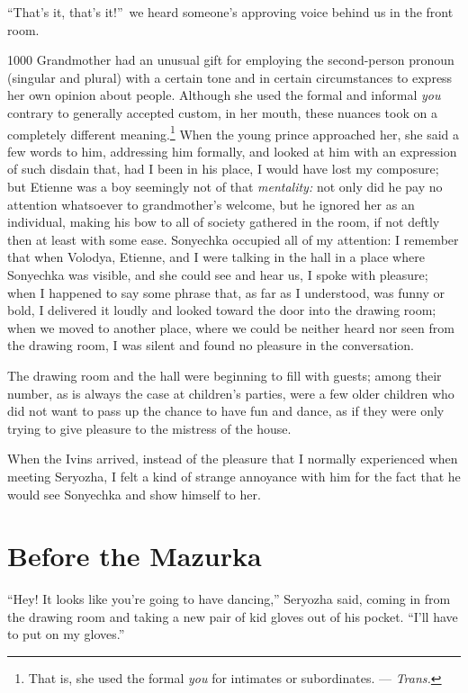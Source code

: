 ``That's it, that's it!''~we heard someone's approving voice behind us in the front room.

\begin{tolerant}{1000}
Grandmother had an unusual gift for employing the second-person pronoun (singular and plural) with a certain tone and in certain circumstances to express her own opinion about people. Although she used the formal and informal \textit{you} contrary to generally accepted custom, in her mouth, these nuances took on a completely different meaning.\footnote{That is, she used the formal \textit{you} for intimates or subordinates. --- \textit{Trans.}} When the young prince approached her, she said a few words to him, addressing him formally, and looked at him with an expression of such disdain that, had I been in his place, I would have lost my composure; but Etienne was a boy seemingly not of that \emph{mentality:} not only did he pay no attention whatsoever to grandmother's welcome, but he ignored her as an individual, making his bow to all of society gathered in the room, if not deftly then at least with some ease. Sonyechka occupied all of my attention: I remember that when Volodya, Etienne, and I were talking in the hall in a place where Sonyechka was visible, and she could see and hear us, I spoke with pleasure; when I happened to say some phrase that, as far as I understood, was funny or bold, I delivered it loudly and looked toward the door into the drawing room; when we moved to another place, where we could be neither heard nor seen from the drawing room, I was silent and found no pleasure in the conversation. 
\end{tolerant}

The drawing room and the hall were beginning to fill with guests; among their number, as is always the case at children's parties, were a few older children who did not want to pass up the chance to have fun and dance, as if they were only trying to give pleasure to the mistress of the house.

When the Ivins arrived, instead of the pleasure that I normally experienced when meeting Seryozha, I felt a kind of strange annoyance with him for the fact that he would see Sonyechka and show himself to her.

\chapter{Before the Mazurka} %

``Hey! It looks like you're going to have dancing,'' Seryozha said, coming in from the drawing room and taking a new pair of kid gloves out of his pocket. ``I'll have to put on my gloves.'' %

